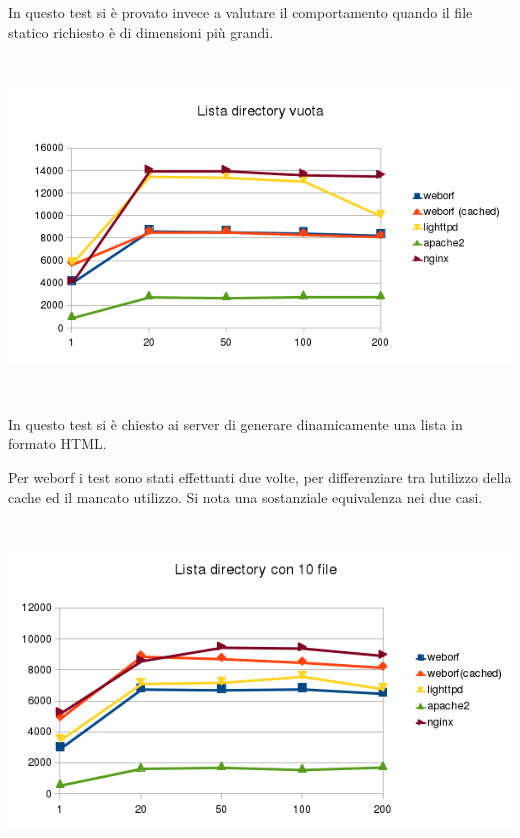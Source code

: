 \documentclass[a4paper,11pt]{article}
\makeatletter
\newcommand\captionof[1]{\def\@captype{#1}\caption}
\makeatother
\begin{document}
{\sffamily
In questo test si \`e provato invece a valutare il comportamento quando
il file statico richiesto \`e di dimensioni pi\`u grandi.}

\begin{minipage}{16cm}
\includegraphics[width=15.998cm,height=8.999cm]{tesi-img5.png}
\captionof{figure}{Comparazione velocit\`a sull{\textquotesingle}invio
di una lista di files contenuti in una directory vuota.}
\end{minipage}

{\sffamily
In questo test si \`e chiesto ai server di generare dinamicamente una
lista in formato HTML.}

{\sffamily
Per weborf i test sono stati effettuati due volte, per differenziare tra
l{\textquotesingle}utilizzo della cache ed il mancato utilizzo. Si nota
una sostanziale equivalenza nei due casi.}


\bigskip

\begin{minipage}{16cm}
\includegraphics[width=16cm,height=8.999cm]{tesi-img6.png}
\captionof{figure}{Comparazione velocit\`a sull{\textquotesingle}invio
di una lista di files contenuti in una directory con 10 file.}
\end{minipage}
\end{document}
